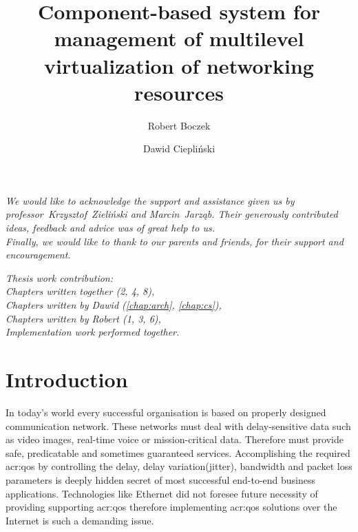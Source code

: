 \documentclass[11pt]{book}
\title{Component-based system for management of multilevel virtualization of networking resources}
\author{Robert Boczek \and Dawid Ciepliński}
\begin{document}
  \maketitle

  \tableofcontents

  \listoffigures

  \printglossaries

  \newpage
	\vspace*{2in}

	\begin{center}
    \textit{We would like to acknowledge the support and assistance given us by professor~Krzysztof~Zieliński and
            Marcin~Jarząb. Their generously contributed ideas, feedback and advice was of great help to us. \\
            Finally, we would like to thank to our parents and friends, for their support and encouragement.}
  \end{center}

  \newpage
	\vspace*{2in}

	\begin{center}
    \textit{Thesis work contribution: \\
            Chapters written together (2, 4, 8), \\
            Chapters written by Dawid (\ref{chap:arch}, \ref{chap:cs}), \\
            Chapters written by Robert (1, 3, 6), \\
            Implementation work performed together.}
  \end{center}

  \chapter{Introduction}

	
  In today's world every successful organisation is based on properly designed communication network. These networks
  must deal with delay-sensitive data such as video images, real-time voice or mission-critical data. Therefore must
  provide safe, predicatable and sometimes guaranteed services. Accomplishing the required \gls{acr:qos} by controlling
  the delay, delay variation(jitter), bandwidth and packet loss parameters is deeply hidden secret of most successful
  end-to-end business applications. Technologies like Ethernet did not foresee future necessity of providing supporting
  \gls{acr:qos} therefore implementing \gls{acr:qos} solutions over the Internet is such a demanding issue. 
\end{document}
